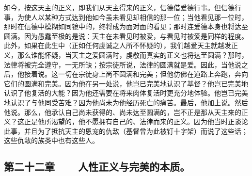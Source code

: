 如今，按这天主的正义，即我们从天主得来的正义，信德借爱德行事。但信德行事，为使人以某种方式达到他如今虽未看见却相信的那一位；当他看见那一位时，那时在信德中模糊如同镜中的，终将成为面对面的看见；那时连爱德本身也将达至圆满。因为愚蠢至极的是说：天主在未看见时被爱，与看见时被爱是同样的程度。此外，如果在此生中（正如任何虔诚之人所不怀疑的），我们越爱天主就越发正义，那么谁能怀疑，当天主之爱圆满时，虔敬而真实的正义也将达至圆满？那时，法律将被完全遵守，一无所缺；按宗徒所说，法律的圆满就是爱。因此，当他说之后，他接着说。这一切在宗徒身上尚不圆满和完美；但他仿佛在道路上奔跑，奔向它们的圆满和完美。因为他在另一处说，他岂已完美地认识了基督？他岂已完美地认识了他复活的大能？因为他还需要在将来肉体复活时更充分地体验。他岂已完美地认识了与他同受苦难？因为他尚未为他经历死亡的痛苦。最后，他加上说。然后他说。那么，他承认自己尚未获得的、尚未达至圆满的，岂不正是那从天主来的正义？这正是他所渴望的，他不愿拥有自己的、法律而来的正义。因为他当时正谈论此事，并且为了抵抗天主的恩宠的仇敌（基督曾为此被钉十字架）而说了这些话；这些仇敌的族类中也有这些人。\par


\subsection{第二十二章——人性正义与完美的本质。}

